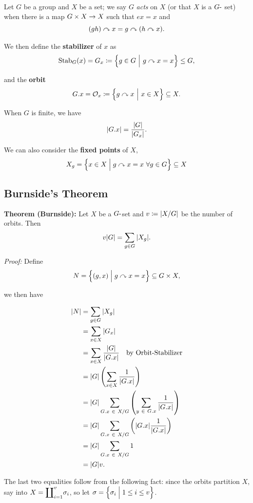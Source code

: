 Let \(G\) be a group and \(X\) be a set; we say \(G\) \emph{acts} on
\(X\) (or that \(X\) is a \(G{\hbox{-}}\) set) when there is a map
\(G\times X \to X\) such that \(ex = x\) and \[
(gh) \curvearrowright x = g \curvearrowright (h \curvearrowright x)
.\]

We then define the \textbf{stabilizer} of \(x\) as \[
\mathrm{Stab}_G(x) = G_x \coloneqq \left\{{g\in G {~\mathrel{\Big|}~} g\curvearrowright x = x}\right\} \leq G,
\]

and the \textbf{orbit} \[
G.x = \mathcal O_x \coloneqq \left\{{g\curvearrowright x {~\mathrel{\Big|}~} x\in X}\right\} \subseteq X.
\]

When \(G\) is finite, we have \[
{\left\lvert {G.x} \right\rvert}  = \frac{{\left\lvert {G} \right\rvert}}{{\left\lvert {G_x} \right\rvert}}.
\]

We can also consider the \textbf{fixed points} of \(X\), \[
X_g = \left\{{x\in X \mathrel{\Big|} g\curvearrowright x = x ~~\forall g\in G}\right\} \subseteq X
\]

\hypertarget{burnsides-theorem}{%
\subsection{Burnside's Theorem}\label{burnsides-theorem}}

\textbf{Theorem (Burnside):} Let \(X\) be a \(G{\hbox{-}}\)set and
\(v \coloneqq {\left\lvert {X/G} \right\rvert}\) be the number of orbits. Then \[
v {\left\lvert {G} \right\rvert} = \sum_{g\in G} {\left\lvert {X_g} \right\rvert}.
\]

\emph{Proof:} Define \[
N = \left\{{(g,x) \mathrel{\Big|} g\curvearrowright x = x}\right\} \subseteq G \times X
,\]

we then have

\begin{align*}
{\left\lvert {N} \right\rvert} &= \sum_{g\in G} {\left\lvert {X_g} \right\rvert} \\
&= \sum_{x\in X} {\left\lvert {G_x} \right\rvert} \\
&= \sum_{x\in X} \frac{{\left\lvert {G} \right\rvert}}{{\left\lvert {G.x} \right\rvert}} \quad\text{by Orbit-Stabilizer} \\
&= {\left\lvert {G} \right\rvert} \left( \sum_{x\in X} \frac{1}{{\left\lvert {G.x} \right\rvert}} \right) \\
&= {\left\lvert {G} \right\rvert} \sum_{G.x ~\in~ X/G} \left( \sum_{y ~\in~ G.x} \frac{1}{{\left\lvert {G.x} \right\rvert}} \right) \\
&= {\left\lvert {G} \right\rvert} \sum_{G.x ~\in~ X/G} \left(
{\left\lvert {G.x} \right\rvert} \frac{1}{{\left\lvert {G.x} \right\rvert}}
\right) \\
&= {\left\lvert {G} \right\rvert} \sum_{G.x ~\in~ X/G} 1 \\
&= {\left\lvert {G} \right\rvert} v
.\end{align*}

The last two equalities follow from the following fact: since the orbits
partition \(X\), say into
\(X = \displaystyle{\coprod}_{i=1}^v \sigma_i\), so let
\(\sigma = \left\{{\sigma_i \mathrel{\Big|} 1 \leq i \leq v}\right\}\).

